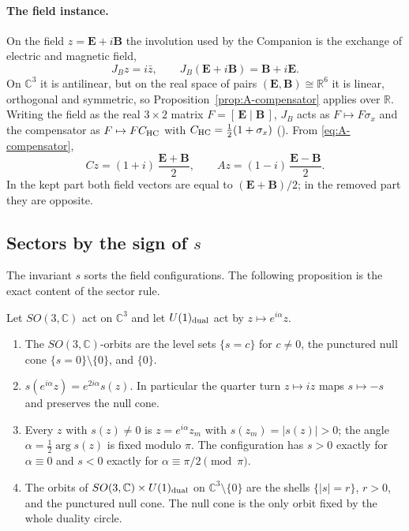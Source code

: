 \paragraph{The field instance.}
On the field $z=\mathbf E+i\mathbf B$ the involution used by the Companion is the exchange of
electric and magnetic field,
\begin{equation}
J_Bz=i\bar z,\qquad J_B(\mathbf E+i\mathbf B)=\mathbf B+i\mathbf E .
\label{eq:A-JB}
\end{equation}
On $\mathbb C^3$ it is antilinear, but on the real space of pairs $(\mathbf E,\mathbf B)\cong\mathbb R^6$
it is linear, orthogonal and symmetric, so Proposition~\ref{prop:A-compensator} applies over $\mathbb R$.
Writing the field as the real $3\times2$ matrix $F=[\,\mathbf E\mid\mathbf B\,]$, $J_B$ acts as
$F\mapsto F\sigma_x$ and the compensator as $F\mapsto FC_{\rm HC}$ with
$C_{\rm HC}=\tfrac12(1+\sigma_x)$ (). From \eqref{eq:A-compensator},
\begin{equation}
Cz=(1+i)\,\frac{\mathbf E+\mathbf B}{2},\qquad Az=(1-i)\,\frac{\mathbf E-\mathbf B}{2}.
\label{eq:A-Cz}
\end{equation}
In the kept part both field vectors are equal to $(\mathbf E+\mathbf B)/2$; in the removed part they
are opposite.

\subsection{Sectors by the sign of \texorpdfstring{$s$}{s}}
\label{sec:A-sectors}

The invariant $s$ sorts the field configurations. The following proposition is the exact content of
the sector rule.

\begin{proposition}
\label{prop:A-orbits}
Let $SO(3,\mathbb C)$ act on $\mathbb C^3$ and let $U(1)_{\rm dual}$ act by $z\mapsto e^{i\alpha}z$.
\begin{enumerate}
\item[(a)] The $SO(3,\mathbb C)$-orbits are the level sets $\{s=c\}$ for $c\neq0$, the punctured null
  cone $\{s=0\}\setminus\{0\}$, and $\{0\}$.
\item[(b)] $s(e^{i\alpha}z)=e^{2i\alpha}s(z)$. In particular the quarter turn $z\mapsto iz$ maps
  $s\mapsto-s$ and preserves the null cone.
\item[(c)] Every $z$ with $s(z)\neq0$ is $z=e^{i\alpha}z_m$ with $s(z_m)=|s(z)|>0$; the angle
  $\alpha=\tfrac12\arg s(z)$ is fixed modulo $\pi$. The configuration has $s>0$ exactly for
  $\alpha\equiv0$ and $s<0$ exactly for $\alpha\equiv\pi/2\pmod\pi$.
\item[(d)] The orbits of $SO(3,\mathbb C)\times U(1)_{\rm dual}$ on $\mathbb C^3\setminus\{0\}$ are the
  shells $\{|s|=r\}$, $r>0$, and the punctured null cone. The null cone is the only orbit fixed by the
  whole duality circle.
\end{enumerate}
\end{proposition}

